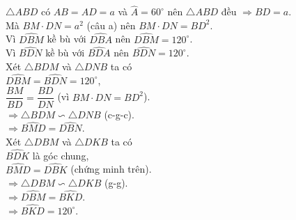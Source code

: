 \begin{bt}
{\begin{enumerate}
{
			}
			\noindent $\triangle ABD$ có $AB=AD=a$ và $\widehat{A}=60^\circ$ nên $\triangle ABD$ đều $\Rightarrow BD=a$.\\
			Mà $BM\cdot DN=a^2$ (câu a) nên $BM\cdot DN=BD^2$.\\
			Vì $\widehat{DBM}$ kề bù với $\widehat{DBA}$ nên $\widehat{DBM}=120^\circ$.\\
			Vì $\widehat{BDN}$ kề bù với $\widehat{BDA}$ nên $\widehat{BDN}=120^\circ$.\\
			Xét $\triangle BDM$ và $\triangle DNB$ ta có\\
			$\widehat{DBM}=\widehat{BDN}=120^\circ$,\\
			$\dfrac{BM}{BD}=\dfrac{BD}{DN}$ (vì $BM\cdot DN=BD^2$).\\
			$\Rightarrow \triangle BDM \backsim \triangle DNB$ (c-g-c).\\
			$\Rightarrow \widehat{BMD}=\widehat{DBN}$.\\
			Xét $\triangle DBM$ và $\triangle DKB$ ta có\\
			$\widehat{BDK}$ là góc chung,\\
			$\widehat{BMD}=\widehat{DBK}$ (chứng minh trên).\\
			$\Rightarrow \triangle DBM \backsim \triangle DKB$ (g-g).\\
			$\Rightarrow \widehat{DBM}=\widehat{BKD}$.\\
			$\Rightarrow \widehat{BKD}=120^\circ$.
		\end{enumerate}
	}
\end{bt}
